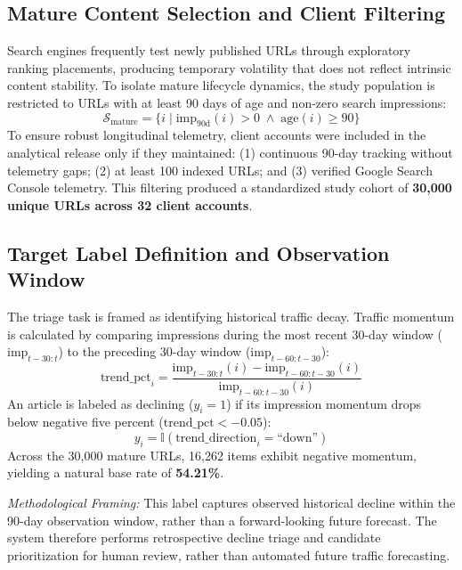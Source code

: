 \documentclass[conference]{IEEEtran}
\begin{document}
\subsection{Mature Content Selection and Client Filtering}
Search engines frequently test newly published URLs through exploratory ranking placements, producing temporary volatility that does not reflect intrinsic content stability. To isolate mature lifecycle dynamics, the study population is restricted to URLs with at least 90 days of age and non-zero search impressions:
\begin{equation}
\mathcal{S}_{\text{mature}} = \{ i \mid \text{imp}_{90\text{d}}(i) > 0 \;\land\; \text{age}(i) \ge 90 \}
\end{equation}
To ensure robust longitudinal telemetry, client accounts were included in the analytical release only if they maintained: (1) continuous 90-day tracking without telemetry gaps; (2) at least 100 indexed URLs; and (3) verified Google Search Console telemetry. This filtering produced a standardized study cohort of \textbf{30,000 unique URLs across 32 client accounts}.

\subsection{Target Label Definition and Observation Window}
The triage task is framed as identifying historical traffic decay. Traffic momentum is calculated by comparing impressions during the most recent 30-day window ($\text{imp}_{t-30:t}$) to the preceding 30-day window ($\text{imp}_{t-60:t-30}$):
\begin{equation}
\text{trend\_pct}_i = \frac{\text{imp}_{t-30:t}(i) - \text{imp}_{t-60:t-30}(i)}{\text{imp}_{t-60:t-30}(i)}
\end{equation}
An article is labeled as declining ($y_i = 1$) if its impression momentum drops below negative five percent ($\text{trend\_pct} < -0.05$):
\begin{equation}
y_i = \mathbb{I}(\text{trend\_direction}_i = \text{``down''})
\end{equation}
Across the 30,000 mature URLs, 16,262 items exhibit negative momentum, yielding a natural base rate of \textbf{54.21\%}.

\textit{Methodological Framing:} This label captures observed historical decline within the 90-day observation window, rather than a forward-looking future forecast. The system therefore performs retrospective decline triage and candidate prioritization for human review, rather than automated future traffic forecasting.
\end{document}
